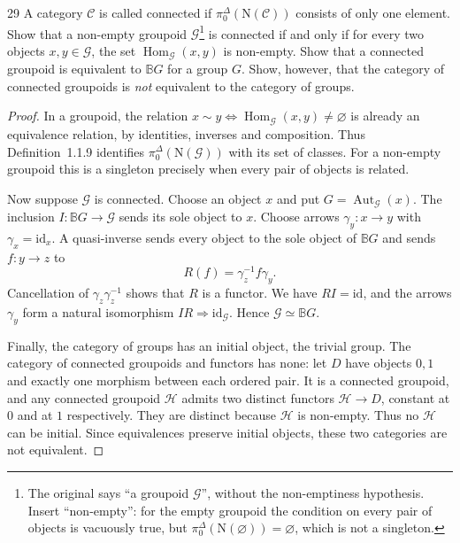 \begin{exercise}{29}
A category $\mathcal C$ is called connected if
$\pi_0^\Delta(\mathrm N(\mathcal C))$ consists of only one element.
Show that a non-empty groupoid $\mathcal G$\footnote{The original
says ``a groupoid $\mathcal G$'', without the non-emptiness
hypothesis. Insert ``non-empty'': for the empty groupoid the
condition on every pair of objects is vacuously true, but
$\pi_0^\Delta(\mathrm N(\varnothing))=\varnothing$, which is not
a singleton.}
is connected if and only if for every two objects $x,y\in\mathcal G$,
the set $\operatorname{Hom}_{\mathcal G}(x,y)$ is non-empty.
Show that a connected groupoid is equivalent to $\mathbb B G$ for a group
$G$. Show, however, that the category of connected groupoids is
\emph{not} equivalent to the category of groups.

\begin{proof}
In a groupoid, the relation
$x\sim y\Longleftrightarrow\operatorname{Hom}_{\mathcal G}(x,y)\ne\varnothing$
is already an equivalence relation, by identities, inverses and
composition. Thus Definition~1.1.9 identifies
$\pi_0^\Delta(\mathrm N(\mathcal G))$ with its set of classes.
For a non-empty groupoid this is a singleton precisely when
every pair of objects is related.

Now suppose $\mathcal G$ is connected. Choose an object $x$ and put
$G=\operatorname{Aut}_{\mathcal G}(x)$.
The inclusion $I\colon\mathbb B G\to\mathcal G$ sends its sole
object to $x$. Choose arrows $\gamma_y\colon x\to y$ with
$\gamma_x=\mathrm{id}_x$. A quasi-inverse sends every object to
the sole object of $\mathbb B G$ and sends $f\colon y\to z$ to
\[
 R(f)=\gamma_z^{-1}f\gamma_y.
\]
Cancellation of $\gamma_z\gamma_z^{-1}$ shows that $R$ is a
functor. We have $RI=\mathrm{id}$, and the arrows $\gamma_y$
form a natural isomorphism $IR\Rightarrow\mathrm{id}_{\mathcal G}$.
Hence $\mathcal G\simeq\mathbb B G$.

Finally, the category of groups has an initial object, the
trivial group. The category of connected groupoids and functors
has none: let $D$ have objects $0,1$ and exactly one morphism
between each ordered pair. It is a connected groupoid, and any
connected groupoid $\mathcal H$ admits two distinct functors
$\mathcal H\to D$, constant at $0$ and at $1$ respectively.
They are distinct because $\mathcal H$ is non-empty.
Thus no $\mathcal H$ can be initial. Since equivalences preserve
initial objects, these two categories are not equivalent.
\end{proof}
\end{exercise}
